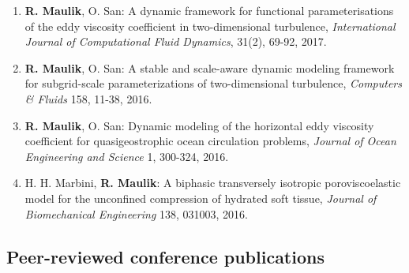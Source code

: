 \documentclass[letterpaper]{article}
\begin{document}
\begin{enumerate}
\item \textbf{R. Maulik}, O. San: A dynamic framework for functional parameterisations of the eddy viscosity coefficient in two-dimensional turbulence, {\it International Journal of Computational Fluid Dynamics}, 31(2), 69-92, 2017. 

\item \textbf{R. Maulik}, O. San: A stable and scale-aware dynamic modeling framework for subgrid-scale parameterizations of two-dimensional turbulence, {\it Computers \& Fluids} 158, 11-38, 2016. 

\item \textbf{R. Maulik}, O. San: Dynamic modeling of the horizontal eddy viscosity coefficient for quasigeostrophic ocean circulation problems, {\it Journal of Ocean Engineering and Science} 1, 300-324, 2016.

\item H. H. Marbini, \textbf{R. Maulik}: A biphasic transversely isotropic poroviscoelastic model for the unconfined compression of hydrated soft tissue, {\it Journal of Biomechanical Engineering} 138, 031003, 2016.

\end{enumerate}

\subsection*{Peer-reviewed conference publications}
\end{document}

